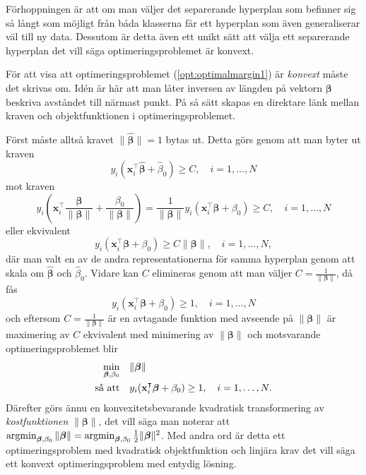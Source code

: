 \documentclass[a4paper, 12pt]{report}
\theoremstyle{definition}
\theoremstyle{remark}
\newcommand{\bfbeta}{{\boldsymbol{\beta}}}
\begin{document}
Förhoppningen är att om man väljer det separerande hyperplan som befinner sig så långt som möjligt från båda klasserna får ett hyperplan som även generaliserar väl till ny data. Dessutom är detta även ett unikt sätt att välja ett separerande hyperplan det vill säga optimeringsproblemet är konvext.

För att visa att optimeringsproblemet (\ref{opt:optimalmargin1}) är \textit{konvext} måste det skrivas om. Idén är här att man låter inversen av längden på vektorn $\bfbeta$ beskriva avståndet till närmast punkt. På så sätt skapas en direktare länk mellan kraven och objektfunktionen i optimeringsproblemet.

Först måste alltså kravet $\|\widehat{\bfbeta}\|=1$ bytas ut. Detta görs genom att man byter ut kraven
\begin{equation*}
y_i(\mathbf{x}_i^\intercal\widehat{\bfbeta}+\widehat{\beta}_0)\geq C,\quad i=1,\dots,N
\end{equation*}
mot kraven
\begin{equation*}
y_i\left(\mathbf{x}_i^\intercal\frac{\bfbeta}{\|\bfbeta\|}+\frac{\beta_0}{\|\bfbeta\|}\right) = 
\frac{1}{\|\bfbeta\|}y_i(\mathbf{x}_i^\intercal\bfbeta+\beta_0)
 \geq C,\quad i=1,\dots,N
\end{equation*}
eller ekvivalent
\begin{equation*}
y_i(\mathbf{x}_i^\intercal\bfbeta+\beta_0)\geq C\|\bfbeta\|,\quad i=1,\dots,N,
\end{equation*}
där man valt en av de andra representationerna för samma hyperplan genom att skala om $\widehat{\bfbeta}$ och $\widehat{\beta}_0$. Vidare kan $C$ elimineras genom att man väljer $C=\frac{1}{\|\bfbeta\|}$, då fås
\begin{equation*}
y_i(\mathbf{x}_i^\intercal\bfbeta+\beta_0)\geq 1,\quad i=1,\dots,N
\end{equation*}
och eftersom $C=\frac{1}{\|\bfbeta\|}$ är en avtagande funktion med avseende på $\|\bfbeta\|$ är maximering av $C$ ekvivalent med minimering av $\|\bfbeta\|$ och motsvarande optimeringsproblemet blir
\begin{equation*}%
\begin{aligned}
\operatornamewithlimits{min}_{\bfbeta,\beta_0} & & &\|\bfbeta\|\\
\text{så att} & & &y_i(\mathbf{x}_i^\intercal\bfbeta+\beta_0)\geq 1,\quad i=1,\dots,N.
\end{aligned}
\end{equation*}
Därefter görs ännu en konvexitetsbevarande kvadratisk transformering av \textit{kostfunktionen} $\|\bfbeta\|$, det vill säga man noterar att $\operatornamewithlimits{argmin}_{\bfbeta,\beta_0} \|\bfbeta\|=\operatornamewithlimits{argmin}_{\bfbeta,\beta_0} \frac{1}{2}\|\bfbeta\|^2$. Med andra ord är detta ett optimeringsproblem med kvadratisk objektfunktion och linjära krav det vill säga ett konvext optimeringsproblem med entydig lösning.
\end{document}
